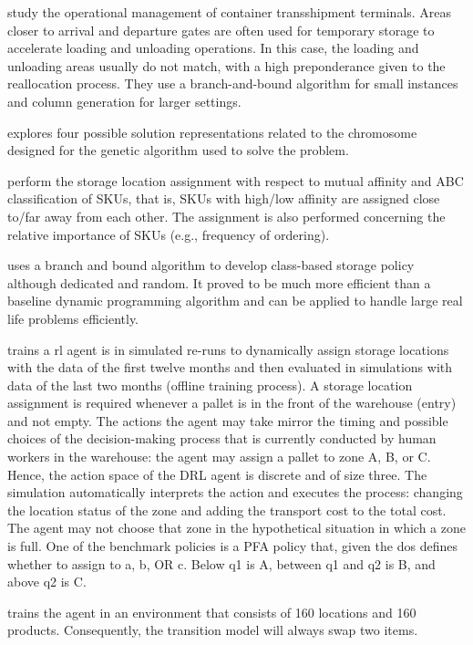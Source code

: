 \documentclass[a4paper,twoside,11pt]{article}
\begin{document}
\cite{moccia2009column} study the operational management of container transshipment terminals. Areas closer to arrival and departure gates are often used for temporary storage to accelerate loading and unloading operations. In this case, the loading and unloading areas usually do not match, with a high preponderance given to the reallocation process. They use a branch-and-bound algorithm for small instances and column generation for larger settings.

\cite{park2010comparing} explores four possible solution representations related to the chromosome designed for the genetic algorithm used to solve the problem.

\cite{li2016dynamic} perform the storage location  assignment with respect to mutual affinity and ABC classification of SKUs, that is, SKUs with high/low affinity are assigned close to/far away from each other. The assignment is also performed concerning the relative importance of SKUs (e.g., frequency of ordering).

\cite{muppani2008branch} uses a branch and bound algorithm to develop class-based storage policy although dedicated and random. It proved to be much more eﬃcient than a baseline dynamic programming algorithm and can be applied to handle large real life problems  eﬃciently.

\cite{waubert2022dynamic} trains a \gls{rl} agent is in simulated re-runs to dynamically assign storage locations with the data of the first twelve months and then evaluated in simulations with data of the last two months (offline training process). A storage location assignment is required whenever a pallet is in the front of the warehouse (entry) and not empty. The actions the agent may take mirror the timing and possible choices of the decision-making process that is currently conducted by human workers in the warehouse: the agent may assign a pallet to zone A, B, or C. Hence, the action space of the DRL agent is discrete and of size three. The simulation automatically interprets the action and executes the process: changing the location status of the zone and adding the transport cost to the total cost. The agent may not choose that zone in the hypothetical situation in which a zone is full. One of the benchmark policies is a PFA policy that, given the \gls{dos} defines whether to assign to a, b, OR c. Below q1 is A, between q1 and q2 is B, and above q2 is C.

\cite{troch2023solving} trains the agent in an environment that consists of 160 locations and 160 products. Consequently, the transition model will always swap two items. 
\end{document}
